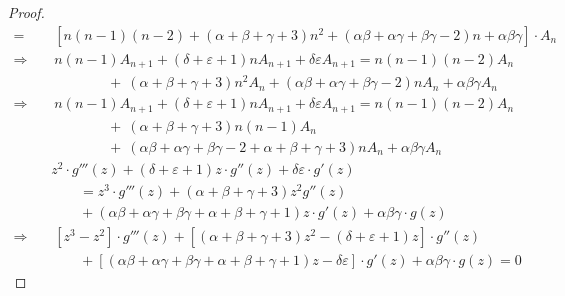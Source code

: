 \begin{proof}
\begin{align*}
        =&~[n(n-1)(n-2)+(\alpha+\beta+\gamma+3)n^2+(\alpha\beta+\alpha\gamma+\beta\gamma-2)n+\alpha\beta\gamma]\cdot  A_n\\
        \Longrightarrow~~~~&~n(n-1)  A_{n+1}+(\delta+\varepsilon+1)n  A_{n+1}+\delta\varepsilon  A_{n+1} = n(n-1)(n-2) A_n\\
        &\qquad\qquad+~(\alpha+\beta+\gamma+3)n^2 A_n+(\alpha\beta+\alpha\gamma+\beta\gamma-2)n A_n+\alpha\beta\gamma A_n\\
        \Longrightarrow~~~~&~n(n-1)  A_{n+1}+(\delta+\varepsilon+1)n  A_{n+1}+\delta\varepsilon  A_{n+1} = n(n-1)(n-2) A_n\\
        &\qquad\qquad+~(\alpha+\beta+\gamma+3)n(n-1) A_n\\
        &\qquad\qquad+~(\alpha\beta+\alpha\gamma+\beta\gamma-2+\alpha+\beta+\gamma+3)n A_n+\alpha\beta\gamma A_n
    \end{align*}
    \begin{align*}
        &z^2\cdot g'''(z)+(\delta+\varepsilon+1)z\cdot g''(z)+\delta\varepsilon\cdot g'(z)\\
        &\qquad= z^3\cdot g'''(z)+(\alpha+\beta+\gamma+3)z^2g''(z)\\
        &\qquad+(\alpha\beta+\alpha\gamma+\beta\gamma+\alpha+\beta+\gamma+1)z\cdot g'(z)+\alpha\beta\gamma\cdot g(z)\\
        \Longrightarrow~~~~&~\left[z^3-z^2\right]\cdot g'''(z) + [(\alpha+\beta+\gamma+3)z^2-(\delta+\varepsilon+1)z]\cdot g''(z)\\
        &\qquad+[(\alpha\beta+\alpha\gamma+\beta\gamma+\alpha+\beta+\gamma+1)z-\delta\varepsilon]\cdot g'(z)+\alpha\beta\gamma\cdot g(z)=0
    \end{align*}
\end{proof}


